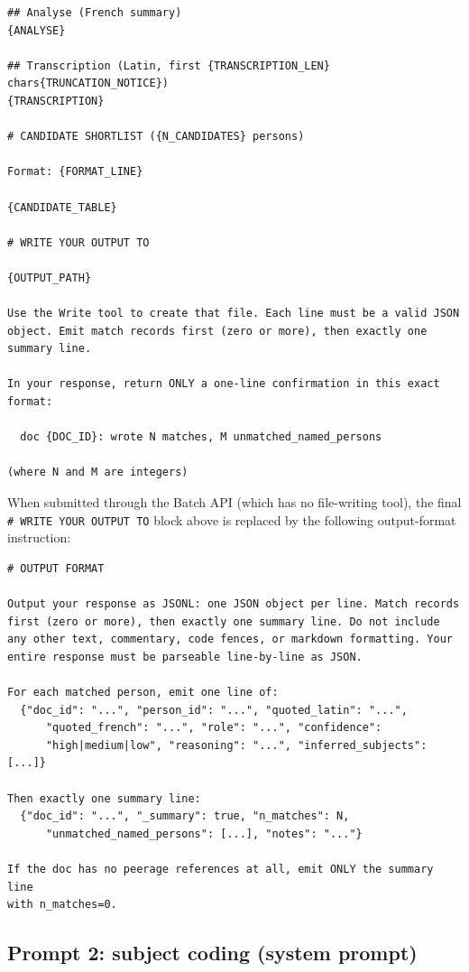 \documentclass[12pt]{article}
\theoremstyle{definition}
\theoremstyle{remark}
\begin{document}
{\begin{verbatim}
## Analyse (French summary)
{ANALYSE}

## Transcription (Latin, first {TRANSCRIPTION_LEN} chars{TRUNCATION_NOTICE})
{TRANSCRIPTION}

# CANDIDATE SHORTLIST ({N_CANDIDATES} persons)

Format: {FORMAT_LINE}

{CANDIDATE_TABLE}

# WRITE YOUR OUTPUT TO

{OUTPUT_PATH}

Use the Write tool to create that file. Each line must be a valid JSON
object. Emit match records first (zero or more), then exactly one
summary line.

In your response, return ONLY a one-line confirmation in this exact
format:

  doc {DOC_ID}: wrote N matches, M unmatched_named_persons

(where N and M are integers)
\end{verbatim}
}

\noindent
When submitted through the Batch API (which has no file-writing tool), the
final \texttt{\# WRITE YOUR OUTPUT TO} block above is replaced by the
following output-format instruction:

{\scriptsize
\begin{verbatim}
# OUTPUT FORMAT

Output your response as JSONL: one JSON object per line. Match records
first (zero or more), then exactly one summary line. Do not include
any other text, commentary, code fences, or markdown formatting. Your
entire response must be parseable line-by-line as JSON.

For each matched person, emit one line of:
  {"doc_id": "...", "person_id": "...", "quoted_latin": "...",
      "quoted_french": "...", "role": "...", "confidence":
      "high|medium|low", "reasoning": "...", "inferred_subjects": [...]}

Then exactly one summary line:
  {"doc_id": "...", "_summary": true, "n_matches": N,
      "unmatched_named_persons": [...], "notes": "..."}

If the doc has no peerage references at all, emit ONLY the summary line
with n_matches=0.
\end{verbatim}
}

\subsection{Prompt 2: subject coding (system prompt)}
\label{app:prompt-coding}
\end{document}
